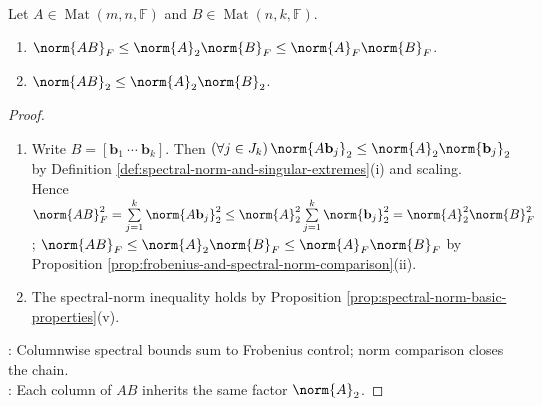\begin{theorem} \label{thm:frobenius-and-spectral-submultiplicativity} \\
Let $A\in\operatorname{Mat}(m,n,\mathbb{F})$ and $B\in\operatorname{Mat}(n,k,\mathbb{F})$.
\begin{enumerate}[label=(\roman*)]
\setlength{\itemsep}{0pt}
\item $\norm{AB}_F\leq\norm{A}_2\norm{B}_F\leq\norm{A}_F\norm{B}_F$.
\item $\norm{AB}_2\leq\norm{A}_2\norm{B}_2$.
\end{enumerate}
\begin{proof}
\begin{enumerate}[label=(\roman*)]
\setlength{\itemsep}{0pt}
\item Write $B=[\mathbf{b}_1\ \cdots\ \mathbf{b}_k]$. Then $(\forall j\in J_k)\,\norm{A\mathbf{b}_j}_2\leq\norm{A}_2\norm{\mathbf{b}_j}_2$ by Definition \ref{def:spectral-norm-and-singular-extremes}(i) and scaling.\\
Hence $\norm{AB}_F^2=\sum\limits_{j=1}^{k}\norm{A\mathbf{b}_j}_2^2\leq\norm{A}_2^2\sum\limits_{j=1}^{k}\norm{\mathbf{b}_j}_2^2=\norm{A}_2^2\norm{B}_F^2$; $\norm{AB}_F\leq\norm{A}_2\norm{B}_F\leq\norm{A}_F\norm{B}_F$ by Proposition \ref{prop:frobenius-and-spectral-norm-comparison}(ii).
\item The spectral-norm inequality holds by Proposition \ref{prop:spectral-norm-basic-properties}(v).
\end{enumerate}
: Columnwise spectral bounds sum to Frobenius control; norm comparison closes the chain.\\
: Each column of $AB$ inherits the same factor $\norm{A}_2$.
\end{proof}
\end{theorem}

